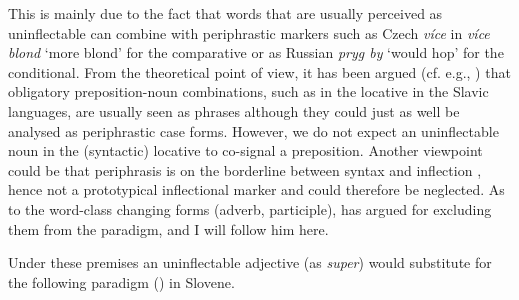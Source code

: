 \documentclass[output=paper]{langscibook}
\begin{document}
This is mainly due to the fact that words that are usually perceived as uninflectable can combine with periphrastic markers such as Czech \textit{více} in \textit{více blond} ‘more blond’ for the comparative or as Russian \textit{pryg by} ‘would hop’ for the conditional. From the theoretical point of view, it has been argued (cf. e.g., \citealt{Haspelmath2000}) that obligatory preposition-noun combinations, such as in the locative in the Slavic languages, are usually seen as phrases although they could just as well be analysed as periphrastic case forms. However, we do not expect an uninflectable noun in the (syntactic) locative to co-signal a preposition. Another viewpoint could be that periphrasis is on the borderline between syntax and inflection \citep{BrownEtAl2012}, hence not a prototypical inflectional marker and could therefore be neglected. As to the word-class changing forms (adverb, participle), \citet{Spencer2020} has argued for excluding them from the paradigm, and I will follow him here.

Under these premises an uninflectable adjective (as \textit{super}) would substitute for the following paradigm () in Slovene.
\end{document}
